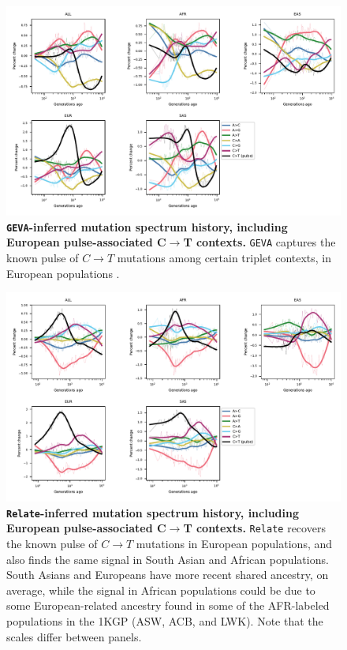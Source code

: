 \documentclass[]{article}
\newcommand{\GEVA}{\texttt{GEVA}\xspace}
\newcommand{\relate}{\texttt{Relate}\xspace}
\begin{document}
\begin{figure}[ht!]
    \centering
    \includegraphics[width=\textwidth]{../plots/spectrum_history.geva.max_age.10000.CtoTpulse.pdf}
    \caption{
        \textbf{\GEVA-inferred mutation spectrum history, including European
            pulse-associated C$\rightarrow$T contexts.}
        \GEVA captures the known pulse of $C\rightarrow T$ mutations among certain
        triplet contexts, in European populations \citep{harris2015evidence}.
    }
    \label{fig:tsdate-spectra-singletons}
\end{figure}


\begin{figure}[ht!]
    \centering
    \includegraphics[width=\textwidth]{../plots/spectrum_history.relate.max_age.10000.CtoTpulse.pdf}
    \caption{
        \textbf{\relate-inferred mutation spectrum history, including European
            pulse-associated C$\rightarrow$T contexts.}
        \relate recovers the known pulse of $C\rightarrow T$ mutations in European
        populations, and also finds the same signal in South Asian and African
        populations. South Asians and Europeans have more recent shared ancestry, on
        average, while the signal in African populations could be due to some
        European-related ancestry found in some of the AFR-labeled populations in the
        1KGP (ASW, ACB, and LWK). Note that the scales differ between panels.
    }
    \label{fig:tsdate-spectra-singletons}
\end{figure}
\end{document}
